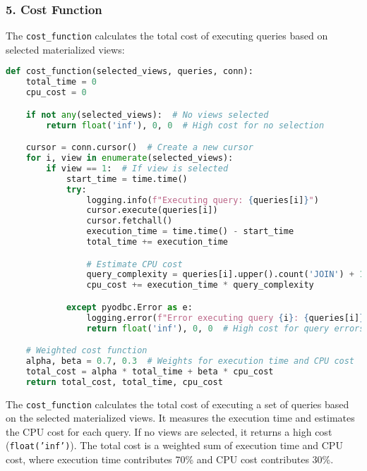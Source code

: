 \subsubsection*{5. Cost Function}
The \texttt{cost\_function} calculates the total cost of executing queries based on selected materialized views:
\begin{lstlisting}[language=Python]
def cost_function(selected_views, queries, conn):
    total_time = 0
    cpu_cost = 0

    if not any(selected_views):  # No views selected
        return float('inf'), 0, 0  # High cost for no selection

    cursor = conn.cursor()  # Create a new cursor
    for i, view in enumerate(selected_views):
        if view == 1:  # If view is selected
            start_time = time.time()
            try:
                logging.info(f"Executing query: {queries[i]}")
                cursor.execute(queries[i])
                cursor.fetchall()
                execution_time = time.time() - start_time
                total_time += execution_time

                # Estimate CPU cost
                query_complexity = queries[i].upper().count('JOIN') + 1
                cpu_cost += execution_time * query_complexity

            except pyodbc.Error as e:
                logging.error(f"Error executing query {i}: {queries[i]}", exc_info=True)
                return float('inf'), 0, 0  # High cost for query errors

    # Weighted cost function
    alpha, beta = 0.7, 0.3  # Weights for execution time and CPU cost
    total_cost = alpha * total_time + beta * cpu_cost
    return total_cost, total_time, cpu_cost
\end{lstlisting}\vspace{.4cm}

The \texttt{cost\_function} calculates the total cost of executing a set of queries based on the selected materialized views. It measures the execution time and estimates the CPU cost for each query. If no views are selected, it returns a high cost (\texttt{float('inf')}). The total cost is a weighted sum of execution time and CPU cost, where execution time contributes 70\% and CPU cost contributes 30\%.

